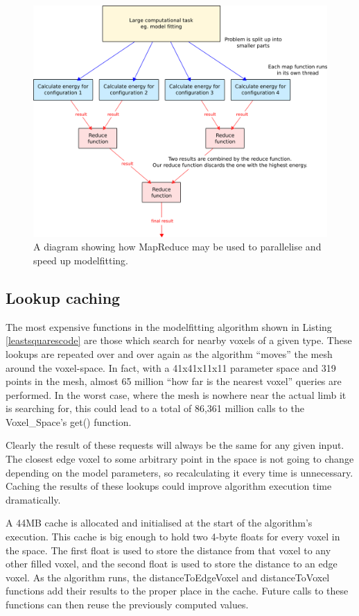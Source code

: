 \begin{figure}[tb]
	\centering
	\includegraphics[width=\textwidth]{mapreduce.png}
	\caption{A diagram showing how MapReduce may be used to parallelise and speed up modelfitting.}
	\label{MapReduceDiagram}
\end{figure}

\subsection{Lookup caching}
\label{Optimisations:LookupCache}

The most expensive functions in the modelfitting algorithm shown in Listing \ref{leastsquarescode} are those which search for nearby voxels of a given type.
These lookups are repeated over and over again as the algorithm ``moves'' the mesh around the voxel-space.
In fact, with a 41x41x11x11 parameter space and 319 points in the mesh, almost 65 million ``how far is the nearest voxel'' queries are performed.
In the worst case, where the mesh is nowhere near the actual limb it is searching for, this could lead to a total of 86,361 million calls to the Voxel\_Space's get() function.

Clearly the result of these requests will always be the same for any given input.
The closest edge voxel to some arbitrary point in the space is not going to change depending on the model parameters, so recalculating it every time is unnecessary.
Caching the results of these lookups could improve algorithm execution time dramatically.

A 44MB cache is allocated and initialised at the start of the algorithm's execution.
This cache is big enough to hold two 4-byte floats for every voxel in the space.
The first float is used to store the distance from that voxel to any other filled voxel, and the second float is used to store the distance to an edge voxel.
As the algorithm runs, the distanceToEdgeVoxel and distanceToVoxel functions add their results to the proper place in the cache.
Future calls to these functions can then reuse the previously computed values.

